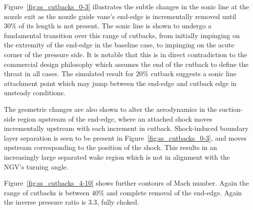 \documentclass[a4paper, 11pt, oneside]{report}
\begin{document}
Figure~\ref{fig:ss_cutbacks_0-3} illustrates the subtle changes in the sonic line at the nozzle exit as the nozzle guide vane's end-edge is incrementally removed until $30\%$ of its length is not present. The sonic line is shown to undergo a fundamental transition over this range of cutbacks, from initially impinging on the extremity of the end-edge in the baseline case, to impinging on the acute corner of the pressure side. It is notable that this is in direct contradiction to the commercial design philosophy which assumes the end of the cutback to define the throat in all cases. The simulated result for $20\%$ cutback suggests a sonic line attachment point which may jump between the end-edge and cutback edge in unsteady conditions.

The geometric changes are also shown to alter the aerodynamics in the suction-side region upstream of the end-edge, where an attached shock moves incrementally upstream with each increment in cutback. Shock-induced boundary layer separation is seen to be present in Figure~\ref{fig:ss_cutbacks_0-3}, and moves upstream corresponding to the position of the shock. This results in an increasingly large separated wake region which is not in alignment with the NGV's turning angle.

Figure~\ref{fig:ss_cutbacks_4-10} shows further contours of Mach number. Again the range of cutbacks is between $40\%$ and complete removal of the end-edge. Again the inverse pressure ratio is $3.3$, fully choked.
\end{document}

